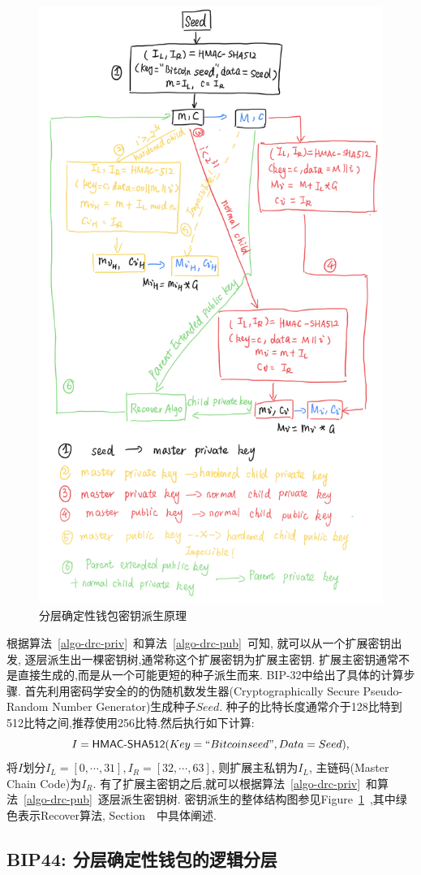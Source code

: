 \begin{figure}
\centering
\includegraphics[width=.7\textwidth]{./outline.png}
\caption{分层确定性钱包密钥派生原理}\label{fig-bip32}
\end{figure}

根据算法~\ref{algo-drc-priv}~和算法~\ref{algo-drc-pub}~可知, 就可以从一个扩展密钥出发,
逐层派生出一棵密钥树,通常称这个扩展密钥为扩展主密钥.
扩展主密钥通常不是直接生成的,而是从一个可能更短的种子派生而来.
BIP-32中给出了具体的计算步骤.
首先利用密码学安全的的伪随机数发生器(Cryptographically Secure Pseudo-Random Number Generator)生成种子$Seed$.
种子的比特长度通常介于128比特到512比特之间,推荐使用256比特.然后执行如下计算:
$$I = \textsf{HMAC-SHA512}(Key = ``Bitcoin seed", Data = Seed),$$
将$I$划分$I_L = [0,\cdots,31], I_R = [32,\cdots,63]$,
则扩展主私钥为$I_L$, 主链码(Master Chain Code)为$I_R$.
有了扩展主密钥之后,就可以根据算法~\ref{algo-drc-priv}~和算法~\ref{algo-drc-pub}~逐层派生密钥树.
密钥派生的整体结构图参见Figure~\ref{fig-bip32}~,其中绿色表示Recover算法, Section~{}~中具体阐述.



\subsection{BIP44: 分层确定性钱包的逻辑分层}


